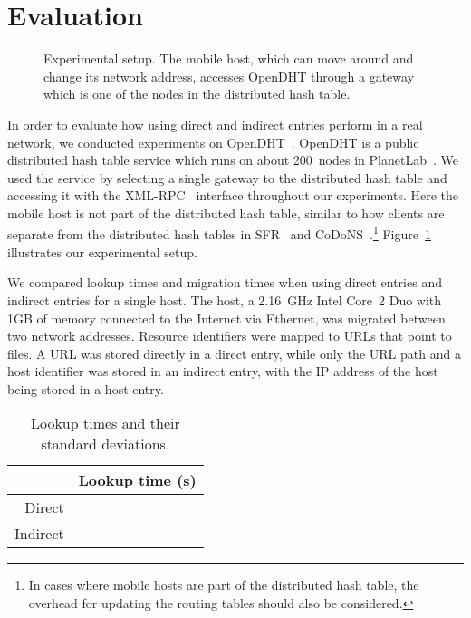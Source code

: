 \documentclass{article}
\begin{document}
\section{Evaluation}
\label{sec:eval}

\begin{figure}
  \centering
  \caption{Experimental setup.  The mobile host, which can move around
    and change its network address, accesses OpenDHT through a gateway
    which is one of the nodes in the distributed hash table.}
  \label{fig:setup}
\end{figure}

In order to evaluate how using direct and indirect entries perform in
a real network, we conducted experiments on
OpenDHT~\cite{rhea:sigcomm2005}.  OpenDHT is a public distributed hash
table service which runs on about 200~nodes in
PlanetLab~\cite{fiuczynski:sigops2006}.  We used the service by
selecting a single gateway to the distributed hash table and accessing
it with the XML-RPC~\cite{xmlrpc} interface throughout our
experiments.  Here the mobile host is not part of the distributed hash
table, similar to how clients are separate from the distributed hash
tables in SFR~\cite{walfish:nsdi2004} and
CoDoNS~\cite{ramasubramanian:sigcomm2004}.\footnote{In cases where
  mobile hosts are part of the distributed hash table, the overhead
  for updating the routing tables should also be considered.}
Figure~\ref{fig:setup} illustrates our experimental setup.

We compared lookup times and migration times when using direct entries
and indirect entries for a single host.  The host, a 2.16~GHz Intel
Core~2 Duo with 1GB of memory connected to the Internet via Ethernet,
was migrated between two network addresses.  Resource identifiers were
mapped to URLs that point to files.  A URL was stored directly in a
direct entry, while only the URL path and a host identifier was stored
in an indirect entry, with the IP address of the host being stored in
a host entry.

\begin{table}
  \centering
  \begin{tabular}{r|r}
    & Lookup time (s) \\ \hline
    Direct &  \\
    Indirect & 
  \end{tabular}
  \caption{Lookup times and their standard deviations.}
  \label{tab:lookup}
\end{table}
\end{document}
